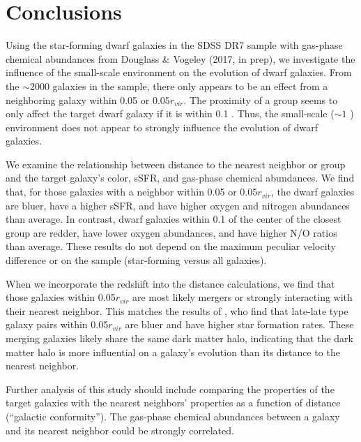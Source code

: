 

\section[Conclusions]{Conclusions}

Using the star-forming dwarf galaxies in the SDSS DR7 sample with gas-phase 
chemical abundances from Douglass \& Vogeley (2017, in prep), we investigate the 
influence of the small-scale environment on the evolution of dwarf galaxies.  
From the $\sim$2000 galaxies in the sample, there only appears to be an effect 
from a neighboring galaxy within 0.05 \hMpc or 0.05$r_{vir}$.  The proximity of 
a group seems to only affect the target dwarf galaxy if it is within 0.1 \hMpc.  
Thus, the small-scale ($\sim 1$ \hMpc) environment does not appear to strongly 
influence the evolution of dwarf galaxies.

We examine the relationship between distance to the nearest neighbor or group 
and the target galaxy's color, sSFR, and gas-phase chemical abundances.  We find 
that, for those galaxies with a neighbor within 0.05 \hMpc or 0.05$r_{vir}$, the 
dwarf galaxies are bluer, have a higher sSFR, and have higher oxygen and 
nitrogen abundances than average.  In contrast, dwarf galaxies within 0.1 \hMpc 
of the center of the closest group are redder, have lower oxygen abundances, and 
have higher N/O ratios than average.  These results do not depend on the maximum 
peculiar velocity difference or on the sample (star-forming versus all 
galaxies).

When we incorporate the redshift into the distance calculations, we find that 
those galaxies within 0.05$r_{vir}$ are most likely mergers or strongly 
interacting with their nearest neighbor.  This matches the results of 
\cite{Park09}, who find that late-late type galaxy pairs within 0.05$r_{vir}$ 
are bluer and have higher star formation rates.  These merging galaxies likely 
share the same dark matter halo, indicating that the dark matter halo is more 
influential on a galaxy's evolution than its distance to the nearest neighbor.

Further analysis of this study should include comparing the properties of the 
target galaxies with the nearest neighbors' properties as a function of 
distance (``galactic conformity'').  The gas-phase chemical abundances between a 
galaxy and its nearest neighbor could be strongly correlated.